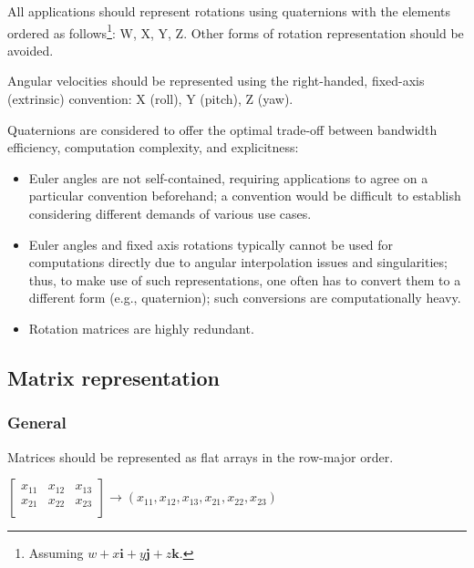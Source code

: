 All applications should represent rotations using quaternions with the elements ordered as follows\footnote{%
    Assuming $w + x\boldsymbol{i} + y\boldsymbol{j} + z\boldsymbol{k}$.
}: W, X, Y, Z.
Other forms of rotation representation should be avoided.

Angular velocities should be represented using the right-handed, fixed-axis (extrinsic) convention:
X (roll), Y (pitch), Z (yaw).

\begin{remark}
    Quaternions are considered to offer the optimal trade-off between bandwidth efficiency,
    computation complexity, and explicitness:
    \begin{itemize}
        \item Euler angles are not self-contained, requiring applications to agree on a particular
        convention beforehand; a convention would be difficult to establish considering different
        demands of various use cases.

        \item Euler angles and fixed axis rotations typically cannot be used for computations directly
        due to angular interpolation issues and singularities; thus, to make use of such
        representations, one often has to convert them to a different form (e.g., quaternion);
        such conversions are computationally heavy.

        \item Rotation matrices are highly redundant.
    \end{itemize}
\end{remark}

\subsection{Matrix representation}

\subsubsection{General}

Matrices should be represented as flat arrays in the row-major order.

\begin{remark}
    $
    \begin{bmatrix}
        x_{11} & x_{12} & x_{13} \\
        x_{21} & x_{22} & x_{23} \\
    \end{bmatrix} \rightarrow \left(x_{11}, x_{12}, x_{13}, x_{21}, x_{22}, x_{23}\right)
    $
\end{remark}

